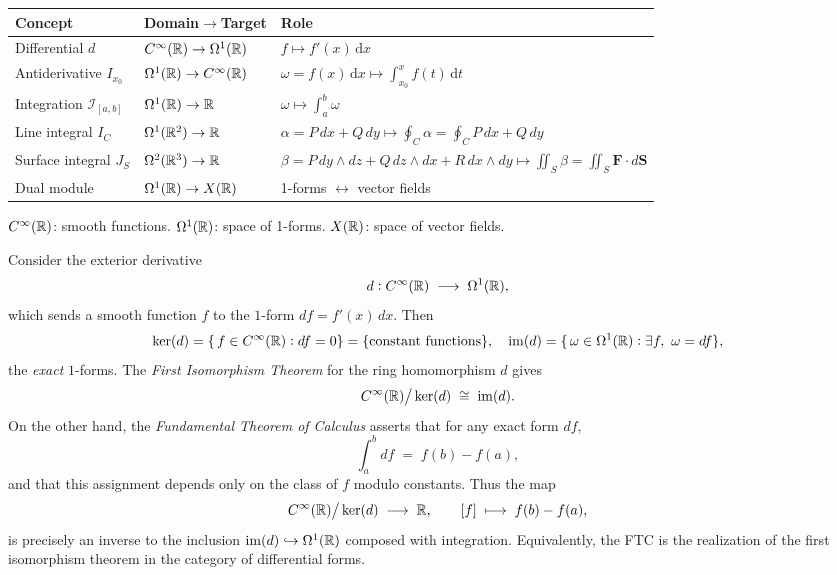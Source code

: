 \documentclass[11pt,openany]{article}
\begin{document}
\begin{tabular}{lll}
	\hline
	\textbf{Concept} & \textbf{Domain\(\to\)Target} & \textbf{Role} \\
	\hline
	Differential \(d\) 
	& \(C^\infty(\mathbb{R})\to\Omega^1(\mathbb{R})\) 
	& \(f\mapsto f'(x)\,\mathrm{d}x\) \\[6pt]
	Antiderivative \(I_{x_0}\) 
	& \(\Omega^1(\mathbb{R})\to C^\infty(\mathbb{R})\) 
	& \(\omega=f(x)\,\mathrm{d}x\mapsto\displaystyle\int_{x_0}^x f(t)\,\mathrm{d}t\) \\[6pt]
	Integration \(\mathcal I_{[a,b]}\) 
	& \(\Omega^1(\mathbb{R})\to\mathbb{R}\) 
	& \(\omega\mapsto\displaystyle\int_a^b\omega\) \\[6pt]
	Line integral \(I_C\) 
	& \(\Omega^1(\mathbb{R}^2)\to\mathbb{R}\) 
	& \(\alpha=P\,dx+Q\,dy\mapsto\displaystyle\oint_C\alpha
	=\oint_C\!P\,dx+Q\,dy\) \\[6pt]
	Surface integral \(J_S\) 
	& \(\Omega^2(\mathbb{R}^3)\to\mathbb{R}\) 
	& \(\beta=P\,dy\wedge dz+Q\,dz\wedge dx+R\,dx\wedge dy\mapsto\displaystyle\iint_S\beta
	=\iint_S\mathbf F\cdot d\mathbf S\) \\[6pt]
	Dual module 
	& \(\Omega^1(\mathbb{R})\to X(\mathbb{R})\) 
	& 1-forms \(\leftrightarrow\) vector fields \\
	\hline
\end{tabular}
\bigskip

\noindent
\textbf{\(C^\infty(\mathbb{R})\)}: smooth functions.  
\quad 
\(\Omega^1(\mathbb{R})\): space of 1-forms.  
\quad 
\(X(\mathbb{R})\): space of vector fields.
\begin{remark}
	Consider the exterior derivative
	\[
	d: C^\infty(\mathbb{R})\;\longrightarrow\;\Omega^1(\mathbb{R}),
	\]
	which sends a smooth function \(f\) to the \(1\)\nobreakdash-form \(df=f'(x)\,dx\).  Then
	\[
	\ker(d)
	=\{\,f\in C^\infty(\mathbb{R}):df=0\}
	=\{\text{constant functions}\},
	\quad
	\mathrm{im}(d)
	=\{\,\omega\in\Omega^1(\mathbb{R}):\exists f,\ \omega=df\},
	\]
	the \emph{exact} \(1\)\nobreakdash-forms.  The \emph{First Isomorphism Theorem} for the ring homomorphism \(d\) gives
	\[
	C^\infty(\mathbb{R})\big/\ker(d)
	\;\cong\;
	\mathrm{im}(d).
	\]
	On the other hand, the \emph{Fundamental Theorem of Calculus} asserts that for any exact form \(df\),
	\[
	\int_a^b df \;=\; f(b)-f(a),
	\]
	and that this assignment depends only on the class of \(f\) modulo constants.  Thus the map
	\[
	C^\infty(\mathbb{R})\big/\ker(d)\;\longrightarrow\;\mathbb{R},
	\qquad
	[f]\;\longmapsto\;f(b)-f(a),
	\]
	is precisely an inverse to the inclusion \(\mathrm{im}(d)\hookrightarrow\Omega^1(\mathbb{R})\) composed with integration.  Equivalently, the FTC is the realization of the first isomorphism theorem in the category of differential forms.
\end{remark}
\end{document}
